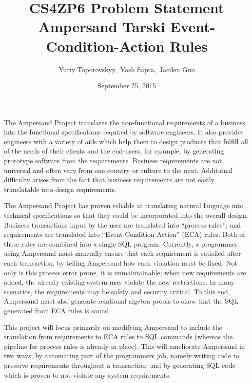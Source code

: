 \documentclass[12pt]{article}
\begin{document}
\title{CS4ZP6 Problem Statement \\ Ampersand Tarski Event-Condition-Action Rules } 
\author{Yuriy Toporovskyy,\ Yash Sapra,\ Jaeden Guo}
\date{September 25, 2015}
\thispagestyle{empty}
\maketitle
{}


The Ampersand Project translates the non-functional requirements of a
business into the functional specifications required by software engineers. It
also provides engineers with a variety of aids which help them to design
products that fulfill all of the needs of their clients and the end-users; for
example, by generating prototype software from the requirements.
Business requirements are not universal and often vary from one country or
culture to the next. Additional difficulty arises from the fact that business
requirements are not easily translatable into design requirements.

The Ampersand Project has proven reliable at translating natural
language into technical specifications so that they could be incorporated into
the overall design. Business transactions input by the user are translated into
``process rules''; and requirements are translated into ``Event-Condition
Action'' (ECA) rules. Both of these rules are combined into a single SQL
program. Currently, a programmer using Ampersand must manually ensure that each
requirement is satisfied after each transaction, by telling Ampersand how each
violation must be fixed. Not only is this process error prone, it is
unmaintainable; when new requirements are added, the already-existing system may
violate the new restrictions. In many scenarios, the requirements may be safety
and security critical. To this end, Ampersand must also generate relational
algebra proofs to show that the SQL generated from ECA rules is sound. 

This project will focus primarily on modifying Ampersand to include the
translation from requirements to ECA rules to SQL commands (whereas the pipeline
for process rules is already in place). This will ameliorate Ampersand in two
ways; by automating part of the programmers job, namely writing code to preserve
requirements throughout a transaction; and by generating SQL code which is
proven to not violate any system requirements. 
\end{document}
